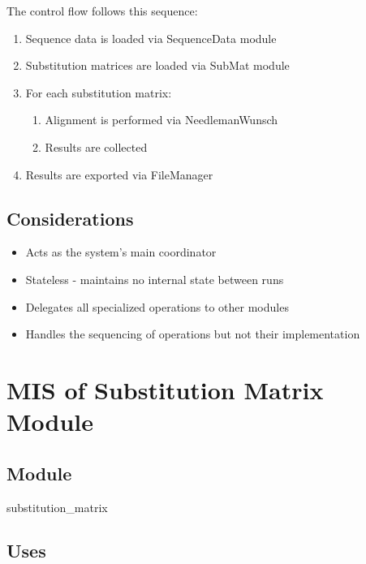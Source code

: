 \documentclass[12pt, titlepage]{article}
\begin{document}
The control flow follows this sequence:

\begin{enumerate}
    \item Sequence data is loaded via SequenceData module
    \item Substitution matrices are loaded via SubMat module
    \item For each substitution matrix:
    \begin{enumerate}
        \item Alignment is performed via NeedlemanWunsch
        \item Results are collected
    \end{enumerate}
    \item Results are exported via FileManager
\end{enumerate}


\subsection{Considerations}

\begin{itemize}
    \item Acts as the system's main coordinator
    \item Stateless - maintains no internal state between runs
    \item Delegates all specialized operations to other modules
    \item Handles the sequencing of operations but not their implementation
\end{itemize}

\section{MIS of Substitution Matrix Module} \label{mSM}

\subsection{Module}

substitution\_matrix

\subsection{Uses}
\end{document}
